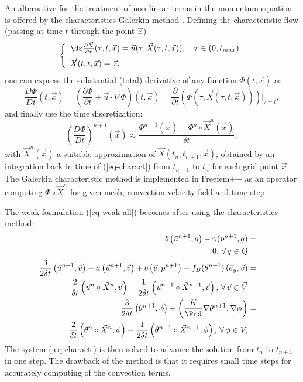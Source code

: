 An alternative for the treatment of non-linear terms in the momentum equation is offered by the characteristics Galerkin method \cite{Pironneau92}. Defining the characteristic flow (passing at time $t$ through the point $\vec{x}$)
\begin{equation}
\left\{
\begin{array}{l}\vspace{0.2cm}
\ds\frac{\partial \vec{X} }{\partial \tau}(\tau, t, \vec{x})=\vec{u} (\tau,\vec{X} (\tau,t, \vec{x})), \quad \tau\in (0,t_{max})\\
\vec{X} (t, t, \vec{x}) = \vec{x},
\end{array}
\right.
\label{eq-charactD}
\end{equation}
one can express the substantial (total) derivative of any function $\Phi(t,\vec{x})$ as
\begin{equation}
\frac{D\Phi}{Dt}(t,\vec{x})=\left( \frac{\partial \Phi}{\partial
	t}+\vec{u}\cdot\nabla \Phi \right)(t,\vec{x})=\frac{\partial}{\partial
	t}\left(\Phi(\tau, \vec{X}(\tau,t, \vec{x}))\right)|_{\tau=t},
\end{equation}
and finally use the time discretization:
\begin{equation}
\left(\frac{D\Phi}{Dt}\right)^{n+1}(\vec{x})\approx\frac{\Phi^{n+1}(\vec{x})-\Phi^{n}\circ \vec{X}^n(\vec{x})}{\delta t},
\end{equation}
with $\vec{X}^n(\vec{x})$ a suitable approximation of $\vec{X}(t_n,t_{n+1},\vec{x})$, obtained by an integration back in time of (\ref{eq-charact}) from $t_{n+1}$ to $t_n$ for each grid point $\vec{x}$. The Galerkin characteristic method is implemented in Freefem++ as an operator computing $\Phi \circ \vec{X}^n$ for given mesh, convection velocity field and time step.

The weak formulation  (\ref{eq-weak-all}) becomes after using the characteristics method:
\begin{eqnarray}
\label{eq-charact}
b\left(\vec{u}^{n+1}, q\right) - \gamma (p^{n+1},q)&=& \\ \nonumber
0, \, \forall \, q \in Q \\ \nonumber
\frac{3}{2 \delta t} \left(\vec{u}^{n+1},\vec{v}\right) +
a\left(\vec{u}^{n+1}, \vec{v}\right) 
+ b\left(\vec{v}, p^{n+1}\right) 
- f_B(\theta^{n+1}) \left(\vec{e}_y,\vec{v}\right)
&=& \\ \nonumber
\frac{2}{\delta t} \left(\vec{u}^{n}\circ \vec{X}^n,\vec{v}\right) - \frac{1}{2 \delta t} \left(\vec{u}^{n-1}\circ \vec{X}^{n-1},\vec{v}\right), \, \forall \, \vec{v} \in \vec{V}\\  \nonumber
\frac{3}{2 \delta t} \left(\theta^{n+1}, \phi\right)  
+
\left( \frac{K}{\Prd} \nabla \theta^{n+1}, \nabla \phi \right) &=& \\ \nonumber
 \frac{2}{\delta t} \left(\theta^{n}\circ \vec{X}^n, \phi\right) -  \frac{1}{2 \delta t} \left(\theta^{n-1}\circ \vec{X}^{n-1}, \phi\right), \, \forall \, \phi \in V,
\end{eqnarray}
The system (\ref{eq-charact}) is then solved to advance the solution from $t_n$ to $t_{n+1}$ in one step. The drawback of the method is that it requires small time steps for accurately computing of the convection terms. 

